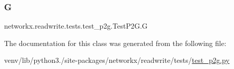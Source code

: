 \subsubsection{\texorpdfstring{G}{G}}
{\footnotesize\ttfamily networkx.\+readwrite.\+tests.\+test\+\_\+p2g.\+Test\+P2\+G.\+G}



The documentation for this class was generated from the following file\+:\begin{DoxyCompactItemize}
\item 
venv/lib/python3./site-\/packages/networkx/readwrite/tests/\hyperlink{test__p2g_8py}{test\+\_\+p2g.\+py}\end{DoxyCompactItemize}
